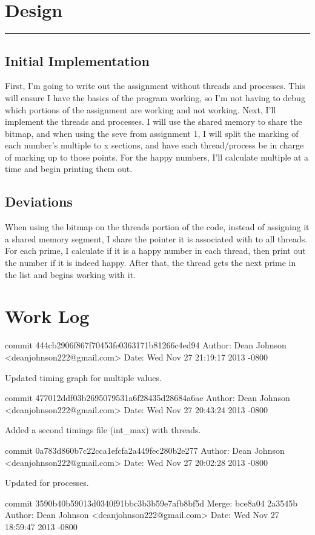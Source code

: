 \documentclass[fleqn,10pt,titlepage]{article}
\begin{document}
\section{Design}
\hrule
\subsection{Initial Implementation}
First, I'm going to write out the assignment without threads and processes. This
will ensure I have the basics of the program working, so I'm not having to debug which
portions of the assignment are working and not working. Next, I'll implement the threads and
processes. I will use the shared memory to share the bitmap, and when using the seve from
assignment 1, I will split the marking of each number's multiple to x sections, and have 
each thread/process be in charge of marking up to those points. For the happy numbers, I'll
calculate multiple at a time and begin printing them out.
\subsection{Deviations}
When using the bitmap on the threads portion of the code, instead of assigning it a shared
memory segment, I share the pointer it is associated with to all threads. For each prime, 
I calculate if it is a happy number in each thread, then print out the number if it is indeed
happy. After that, the thread gets the next prime in the list and begins working with it.
\clearpage

\section{Work Log}
commit 444cb2906f867f70453fe0363171b81266c4ed94
Author: Dean Johnson <deanjohnson222@gmail.com>
Date:   Wed Nov 27 21:19:17 2013 -0800

    Updated timing graph for multiple values.

commit 477012ddf03b2695079531a6f28435d28684a6ae
Author: Dean Johnson <deanjohnson222@gmail.com>
Date:   Wed Nov 27 20:43:24 2013 -0800

    Added a second timings file (int_max) with threads.

commit 0a783d860b7c22cca1efcfa2a449fec280b2e277
Author: Dean Johnson <deanjohnson222@gmail.com>
Date:   Wed Nov 27 20:02:28 2013 -0800

    Updated for processes.

commit 3590b40b59013d0340f91bbc3b3b59e7afb8bf5d
Merge: bce8a04 2a3545b
Author: Dean Johnson <deanjohnson222@gmail.com>
Date:   Wed Nov 27 18:59:47 2013 -0800
\end{document}
